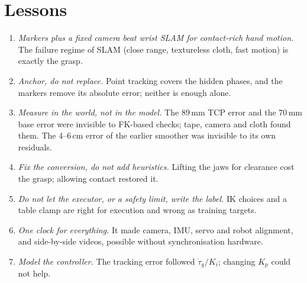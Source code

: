 \documentclass[conference,10pt]{IEEEtran}
\newcommand{\mm}{\,mm\xspace}
\begin{document}
\section{Lessons}\label{sec:lessons}
\begin{enumerate}
\item \emph{Markers plus a fixed camera beat wrist SLAM for contact-rich hand motion.} The failure regime of SLAM (close
  range, textureless cloth, fast motion) is exactly the grasp.
\item \emph{Anchor, do not replace.} Point tracking covers the hidden phases, and the markers remove its absolute error;
  neither is enough alone.
\item \emph{Measure in the world, not in the model.} The 89\mm TCP error and the 70\mm base error were invisible to
  FK-based checks; tape, camera and cloth found them. The 4--6\,cm error of the earlier smoother was invisible to its own
  residuals.
\item \emph{Fix the conversion, do not add heuristics.} Lifting the jaws for clearance cost the grasp; allowing contact
  restored it.
\item \emph{Do not let the executor, or a safety limit, write the label.} IK choices and a table clamp are right for
  execution and wrong as training targets.
\item \emph{One clock for everything.} It made camera, IMU, servo and robot alignment, and side-by-side videos, possible
  without synchronisation hardware.
\item \emph{Model the controller.} The tracking error followed $\dot\tau_g/K_i$; changing $K_p$ could not help.
\end{enumerate}

\end{document}
